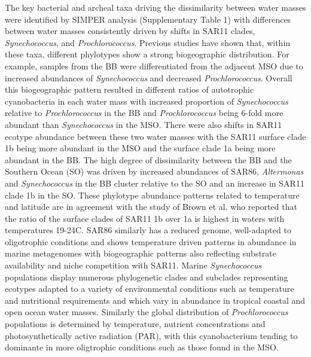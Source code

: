 The key bacterial and archeal taxa driving the dissimilarity between water masses were identified by SIMPER analysis (Supplementary Table 1) with differences between water masses consistently driven by shifts in SAR11 clades, {\em Synechococcus}, and {\em Prochlorococcus}. Previous studies have shown that, within these taxa, different phylotypes show a strong biogeographic distribution. \cite{brown_trait_2014} For example, samples from the BB were differentiated from the adjacent MSO due to increased abundances of {\em Synechococcus} and decreased {\em Prochlorococcus}. Overall this biogeographic pattern resulted in different ratios of autotrophic cyanobacteria in each water mass with increased proportion of {\em Synechococcus} relative to {\em Prochlorococcus} in the BB and {\em Prochlorococcus} being 6-fold more abundant than {\em Synechococcus} in the MSO. There were also shifts in SAR11 ecotype abundance between these two water masses with the SAR11 surface clade 1b being more abundant in the MSO and the surface clade 1a being more abundant in the BB. The high degree of dissimilarity between the BB and the Southern Ocean (SO) was driven by increased abundances of SAR86, {\em Altermonas} and {\em Synechococcus} in the BB cluster relative to the SO and an increase in SAR11 clade 1b in the SO. These phylotype abundance patterns related to temperature and latitude are in agreement with the study of Brown et al. \cite{brown_global_2012} who reported that the ratio of the surface clades of SAR11 1b over 1a is highest in waters with temperatures 19-24\degree C. \cite{brown_global_2012} SAR86 similarly has a reduced genome, well-adapted to oligotrophic conditions and shows temperature driven patterns in abundance in marine metagenomes \cite{dupont_genomic_2012} with biogeographic patterns also reflecting substrate availability and niche competition with SAR11. \cite{dupont_genomic_2012} Marine {\em Synechococcus} populations display numerous phylogenetic clades and subclades \cite{mazard_multi-locus_2012} representing ecotypes adapted to a variety of environmental conditions such as temperature and nutritional requirements and which vary in abundance in tropical coastal and open ocean water masses. \cite{brown_trait_2014} Similarly the global distribution of {\em Prochlorococcus} populations is determined by temperature, nutrient concentrations and photosynthetically active radiation (PAR), with this cyanobacterium tending to dominante in more oligtrophic conditions \cite{brown_trait_2014} such as those found in the MSO.

